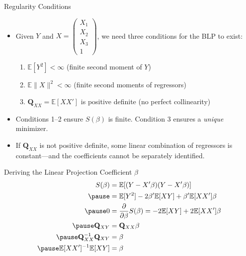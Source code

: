 \documentclass[aspectratio=169, handout, t]{beamer}
\numberwithin{equation}{section}
\begin{document}
\begin{frame}{Regularity Conditions}
\begin{itemize}
\item Given $Y$ and $X=\begin{pmatrix} X_1\\ X_2\\X_3\\1 \end{pmatrix}$, we need three conditions for the BLP to exist:
\begin{enumerate}
\item $\mathbb{E}[Y^2]<\infty$ \hfill (finite second moment of $Y$)
\item $\mathbb{E}\|X\|^2<\infty$ \hfill (finite second moments of regressors)
\item $\mathbf{Q}_{XX}=\mathbb{E}[XX']$ is positive definite \hfill (no perfect collinearity)
\end{enumerate}\pause
\bigskip
\item Conditions 1--2 ensure $S(\beta)$ is finite.  Condition 3 ensures a \emph{unique} minimizer.
\item If $\mathbf{Q}_{XX}$ is not positive definite, some linear combination of regressors is constant---and the coefficients cannot be separately identified.
\end{itemize}
\end{frame}



\begin{frame}{Deriving the Linear Projection Coefficient $\beta$}
\begin{align*}
S(\beta)&=\mathbb{E}[(Y-X'\beta)(Y-X'\beta)]\\\pause
&=\mathbb{E}[Y^2]-2\beta'\mathbb{E}[XY]+\beta'\mathbb{E}[XX']\beta\\\pause
0&=\frac{\partial}{\partial \beta} S(\beta)=-2\mathbb{E}[XY]+2\mathbb{E}[XX']\beta\\\pause
\mathbf{Q}_{XY}&=\mathbf{Q}_{XX}\beta\\\pause
\mathbf{Q}_{XX}^{-1}\mathbf{Q}_{XY}&=\beta\\\pause
\mathbb{E}[XX']^{-1}\mathbb{E}[XY]&=\beta
\end{align*}
\end{frame}
\end{document}
